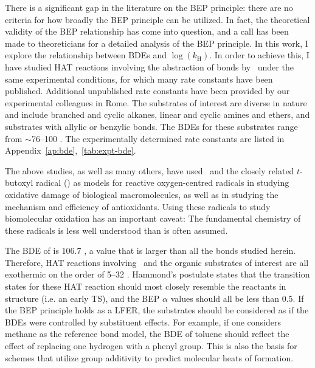 \begin{doublespace}
There is a significant gap in the literature on the BEP principle: there are no
criteria for how broadly the BEP principle can be utilized. In fact, the
theoretical validity of the BEP relationship has come into question, and a call
has been made to theoreticians for a detailed analysis of the BEP
principle.\cite{vanSanten2010} In this work, I explore the relationship between
BDEs and $\log(k_\mathrm{H})$. In order to achieve this, I have studied HAT
reactions involving the abstraction of  bonds by \cumo\ under the same
experimental conditions, for which many rate constants have been
published.\cite{Bietti2010, Bietti2011, Pischel2001, Salamone2011, Salamone2012,
Salamone2012a, Salamone2013, Salamone2015} Additional unpublished rate constants
have been provided by our experimental colleagues in Rome. The substrates of
interest are diverse in nature and include branched and cyclic alkanes, linear
and cyclic amines and ethers, and substrates with allylic or benzylic 
bonds. The BDEs for these substrates range from $\sim$76--100 \kcalmol. The
experimentally determined rate constants are listed in
Appendix~\ref{ap:bde},~\ref{tab:expt-bde}.

The above studies, as well as many others, have used \cumo\ and the closely
related $t$-butoxyl radical () as models for reactive
oxygen-centred radicals in studying oxidative damage of biological
macromolecules,\cite{Adam1998, Adam2002, Jones2003} as well as in studying the
mechanism and efficiency of antioxidants.\cite{MacFaul1996, Valgimigli1996,
Valgimigli1999, Jovanovic1999, Sortino2003} Using these radicals to study
biomolecular oxidation has an important caveat: The fundamental chemistry of
these radicals is less well understood than is often assumed. \cite{Tanko2001,
Finn2004, Salamone2011b}

The BDE of  is 106.7 \kcalmol, a value that is larger than all the
 bonds studied herein. Therefore, HAT reactions involving \cumo\ and the organic substrates of
interest are all exothermic on the order of 5--32 \kcalmol. Hammond's
postulate\cite{Hammond1955} states that the transition states for these HAT
reaction should most closely resemble the reactants in structure (i.e.  an early
TS), and the BEP $\alpha$ values should all be less than 0.5.\cite{Russell1973}
If the BEP principle holds as a LFER, the substrates should be considered as if
the BDEs were controlled by substituent effects. For example, if one considers
methane as the reference  bond model, the BDE of toluene should reflect
the effect of replacing one hydrogen with a phenyl group. This is also the basis
for schemes that utilize group additivity to predict molecular heats of
formation.\cite{Benson1976}


\end{doublespace}
